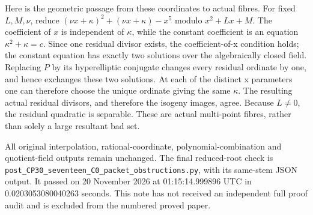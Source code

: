 Here is the geometric passage from these coordinates to actual fibres.
For fixed \(L,M,\nu\), reduce
\((\nu x+\kappa)^2+(\nu x+\kappa)-x^5\) modulo
\(x^2+Lx+M\).  The coefficient of \(x\) is independent of
\(\kappa\), while the constant coefficient is an equation
\(\kappa^2+\kappa=c\).  Since one residual divisor exists, the
coefficient-of-x condition holds; the constant equation has exactly two
solutions over the algebraically closed field.  Replacing \(P\) by
its hyperelliptic conjugate changes every residual ordinate by one,
and hence exchanges these two solutions.  At each of the distinct
x parameters one can therefore choose the unique ordinate giving
the same \(\kappa\).  The resulting actual residual divisors, and
therefore the isogeny images, agree.  Because \(L\ne0\), the residual
quadratic is separable.  These are actual multi-point fibres, rather
than solely a large resultant bad set.

All original interpolation, rational-coordinate, polynomial-combination
and quotient-field outputs remain unchanged.  The final reduced-root
check is
\texttt{post\_CP30\_seventeen\_C0\_packet\_obstructions.py},
with its same-stem JSON output.  It passed on
20 November 2026 at 01:15:14.999896 UTC in 0.0203053080040263 seconds.
This note has not received an independent full proof audit and is
excluded from the numbered proved paper.
